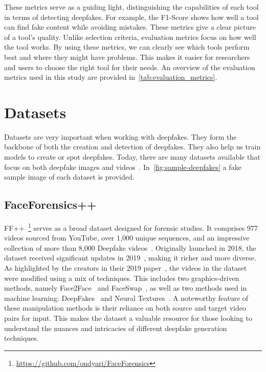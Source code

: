 These metrics serve as a guiding light, distinguishing the capabilities of each tool
in terms of detecting deepfakes. For example, the F1-Score shows how well a tool can
find fake content while avoiding mistakes. These metrics give a clear picture of a
tool's quality. Unlike selection criteria, evaluation metrics focus on how well the
tool works. By using these metrics, we can clearly see which tools perform best and
where they might have problems. This makes it easier for researchers and users to
choose the right tool for their needs.
An overview of the evaluation metrics used in this study are provided in~\autoref{tab:evaluation_metrics}.

\section{Datasets}
Datasets are very important when working with deepfakes. They form the backbone of both
the creation and detection of deepfakes. They also help us train models to create or spot
deepfakes. Today, there are many datasets available that focus on both deepfake images
and videos~\cite{deepfake-dataset,zi2020wilddeepfake,10.1145/3531536.3532946}.
In~\autoref{fig:sample-deepfakes} a fake sample image of each dataset is provided.

\subsection{FaceForensics++}\label{section:ff++}
\ac{FF++}~\footnote{\url{https://github.com/ondyari/FaceForensics}} serves as a
broad dataset designed for forensic studies. It
comprises 977 videos sourced from YouTube, over 1,000 unique sequences, and an
impressive collection of more than 8,000 Deepfake videos~\cite{roessler2019faceforensicspp,masters-thesis}.
Originally launched in 2018, the dataset received significant updates in 2019~\cite{masters-thesis},
making it richer and more diverse. As highlighted by the creators in their 2019 paper~\cite{roessler2019faceforensicspp},
the videos in the dataset were modified using a mix of techniques. This includes two
graphics-driven methods, namely Face2Face~\cite{thies2020face2face} and FaceSwap~\cite{faceswap},
as well as two methods used in machine learning: DeepFakes~\cite{faceswap-deepfake}
and Neural Textures~\cite{thies2019deferred}. A noteworthy feature of these
manipulation methods is their reliance on both source and target video pairs for input.
This makes the dataset a valuable resource for those looking to understand the
nuances and intricacies of different deepfake generation techniques.

